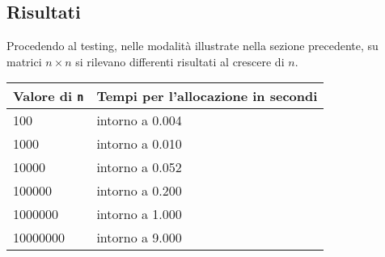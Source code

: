 \documentclass[12pt]{article}
\begin{document}
\subsection{Risultati}
Procedendo al testing, nelle modalità illustrate nella sezione precedente, su matrici \(n \times n\) si rilevano differenti risultati al crescere di \(n\).
\begin{table}[h!]
    \begin{center}
        \label{tab:allocazione}
        \begin{tabular}{p{3cm}|p{6cm}}
            \toprule
            \textbf{Valore di} \texttt{n} & \textbf{Tempi per l'allocazione in secondi}\\
            \midrule
            100 & intorno a 0.004\\
            1000 & intorno a 0.010 \\
            10000 & intorno a 0.052 \\
            100000 & intorno a 0.200 \\
            1000000 & intorno a 1.000 \\
            10000000 & intorno a 9.000 \\
            \bottomrule
        \end{tabular}
    \end{center}
\end{table}
\end{document}
